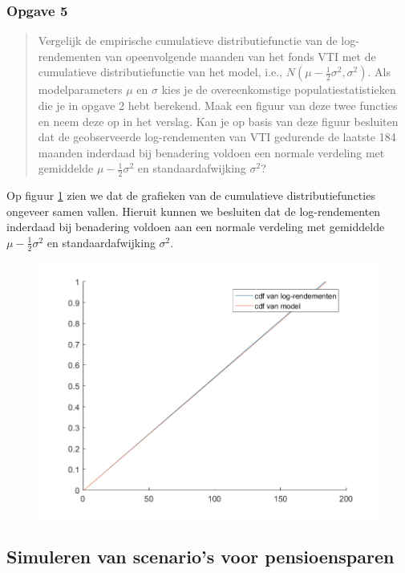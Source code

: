 \documentclass[11pt, a4paper, titlepage, openright]{article}
\begin{document}
	\subsubsection{Opgave 5}
		\begin{quote}
			Vergelijk de empirische cumulatieve distributiefunctie van de log-rendementen van opeenvolgende maanden
			van het fonds VTI met de cumulatieve distributiefunctie van het model, i.e.,
			\( N(\mu - \frac{1}{2} \sigma^{2}, \sigma^{2}) \). Als modelparameters \( \mu \) en \( \sigma \)
			kies je de overeenkomstige populatiestatistieken die je in opgave 2 hebt berekend. Maak een figuur
			van deze twee functies en neem deze op in het verslag. Kan je op basis van deze figuur besluiten
			dat de geobserveerde log-rendementen van VTI gedurende de laatste 184 maanden inderdaad bij
			benadering voldoen een normale verdeling met gemiddelde \( \mu - \frac{1}{2} \sigma^{2} \) en standaardafwijking \( \sigma^{2} \)?
		\end{quote}

		\noindent Op figuur \ref{fig:ex5} zien we dat de grafieken van de cumulatieve distributiefuncties ongeveer samen vallen.
		Hieruit kunnen we besluiten dat de log-rendementen inderdaad bij benadering voldoen aan
		een normale verdeling met gemiddelde \( \mu - \frac{1}{2} \sigma^{2} \) en standaardafwijking \( \sigma^{2} \).

		\begin{figure}[H]
			\centering
			\includegraphics[width=0.7\linewidth]{../ex5}
			\caption{}
			\label{fig:ex5}
		\end{figure}



	\subsection{Simuleren van scenario's voor pensioensparen}
\end{document}
